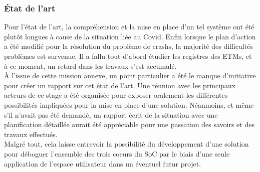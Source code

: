 \subsubsection{État de l'art}
\label{sec:state_of_the_art}

Pour l'état de l'art, la compréhension et la mise en place d'un tel système
ont été plutôt longues à cause de la situation liée au Covid. Enfin lorsque le
plan d'action a été modifié pour la résolution du problème de crashs, la
majorité des difficultés problèmes est survenue. Il a fallu tout d'abord
étudier les registres des ETMs, et à ce moment, un retard dans les travaux
s'est accumulé. \\

À l'issue de cette mission annexe, un point particulier a été le manque
d'initiative pour créer un rapport sur cet état de l'art. Une réunion avec les
principaux acteurs de ce stage a été organisée pour exposer oralement les
différentes possibilités impliquées pour la mise en place d'une solution.
Néanmoins, et même s'il n'avait pas été demandé, un rapport écrit de la
situation avec une planification détaillée aurait été appréciable pour une
passation des savoirs et des travaux effectués. \\

Malgré tout, cela laisse entrevoir la possibilité du développement d'une
solution pour déboguer l'ensemble des trois coeurs du SoC par le biais d'une
seule application de l'espace utilisateur dans un éventuel futur projet.


